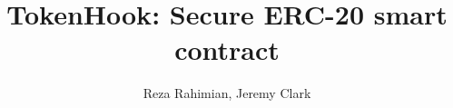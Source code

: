 \documentclass[envcountsect]{llncs}
\newcommand{\sys}{\textsf{TokenHook}\xspace}
\newcommand{\erc}{ERC-20\xspace}
\begin{document}
\frontmatter
\mainmatter

\title{\Large \bf \sys : Secure \erc smart contract}
\author{Reza Rahimian, Jeremy Clark}

\maketitle














{\footnotesize}


%
%
\end{document}
